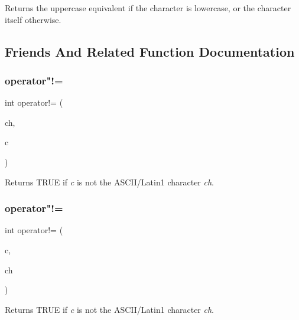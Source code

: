 Returns the uppercase equivalent if the character is lowercase, or the character itself otherwise. 

\subsection{Friends And Related Function Documentation}
\mbox{\label{class_q_char_a1b92f64e5743d28c56a489a5d7ad585b}} 
\subsubsection{\texorpdfstring{operator"!=}{operator!=}\hspace{0.1cm}{\footnotesize\ttfamily [1/3]}}
{\footnotesize\ttfamily int operator!= (\begin{DoxyParamCaption}\item[{char}]{ch,  }\item[{\mbox{\hyperlink{class_q_char}{Q\+Char}}}]{c }\end{DoxyParamCaption})\hspace{0.3cm}{\ttfamily [friend]}}

Returns T\+R\+UE if {\itshape c} is not the A\+S\+C\+I\+I/\+Latin1 character {\itshape ch}. \mbox{\label{class_q_char_adace471124ee79e40a78029bb638ae7a}} 
\subsubsection{\texorpdfstring{operator"!=}{operator!=}\hspace{0.1cm}{\footnotesize\ttfamily [2/3]}}
{\footnotesize\ttfamily int operator!= (\begin{DoxyParamCaption}\item[{\mbox{\hyperlink{class_q_char}{Q\+Char}}}]{c,  }\item[{char}]{ch }\end{DoxyParamCaption})\hspace{0.3cm}{\ttfamily [friend]}}

Returns T\+R\+UE if {\itshape c} is not the A\+S\+C\+I\+I/\+Latin1 character {\itshape ch}. \mbox{\label{class_q_char_a166bb280e1dab17703d96e00c39c97ab}} 
